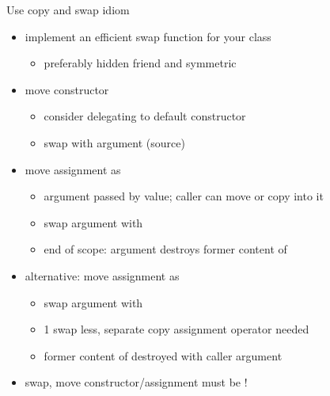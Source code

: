 \begin{frame}[fragile]
  \begin{block}{Use copy and swap idiom}
    \begin{itemize}
    \item implement an efficient swap function for your class
      \begin{itemize}
      \item preferably hidden friend and symmetric
      \end{itemize}
    \item move constructor
      \begin{itemize}
      \item consider delegating to default constructor
      \item swap  with argument (source)
      \end{itemize}
    \item move assignment as 
      \begin{itemize}
      \item argument passed by value; caller can move or copy into it
      \item swap argument with 
      \item end of scope: argument destroys former content of 
      \end{itemize}
    \item alternative: move assignment as 
      \begin{itemize}
      \item swap argument with 
      \item 1 swap less, separate copy assignment operator needed
      \item former content of  destroyed with caller argument
      \end{itemize}
    \item swap, move constructor/assignment must be !
    \end{itemize}
  \end{block}
\end{frame}

